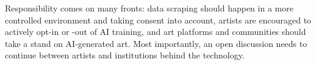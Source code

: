 Responsibility comes on many fronts: data scraping should happen in a more controlled environment and taking consent into account, artists are encouraged to actively opt-in or -out of AI training, and art platforms and communities should take a stand on AI-generated art. Most importantly, an open discussion needs to continue between artists and institutions behind the technology.








